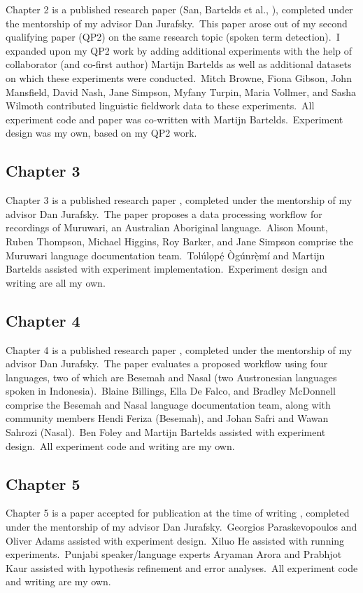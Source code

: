 \documentclass[main.tex]{subfiles}
\begin{document}
Chapter 2 is a published research paper (San, Bartelds et al., \citeyear{san2021leveraging}), completed under the mentorship of my advisor Dan Jurafsky.~This paper arose out of my second qualifying paper (QP2) on the same research topic (spoken term detection).~I expanded upon my QP2 work by adding additional experiments with the help of collaborator (and co-first author) Martijn Bartelds as well as additional datasets on which these experiments were conducted.~Mitch Browne, Fiona Gibson, John Mansfield, David Nash, Jane Simpson, Myfany Turpin, Maria Vollmer, and Sasha Wilmoth contributed linguistic fieldwork data to these experiments.~All experiment code and paper was co-written with Martijn Bartelds.~Experiment design was my own, based on my QP2 work.

\subsection{Chapter 3}

Chapter 3 is a published research paper \parencite{san-etal-2022-automated}, completed under the mentorship of my advisor Dan Jurafsky.~The paper proposes a data processing workflow for recordings of Muruwari, an Australian Aboriginal language.~Alison Mount, Ruben Thompson, Michael Higgins, Roy Barker, and Jane Simpson comprise the Muruwari language documentation team.~Tol\'{u}l\d{o}p\d{\'{e}} \`{O}g\'{u}nr\d{\`{e}}m\'{i} and Martijn Bartelds assisted with experiment implementation.~Experiment design and writing are all my own.

\subsection{Chapter 4}

Chapter 4 is a published research paper \parencite{san-etal-2023-leveraging}, completed under the mentorship of my advisor Dan Jurafsky.~The paper evaluates a proposed workflow using four languages, two of which are Besemah and Nasal (two Austronesian languages spoken in Indonesia).~Blaine Billings, Ella De Falco, and Bradley McDonnell comprise the Besemah and Nasal language documentation team, along with community members Hendi Feriza (Besemah), and Johan Safri and Wawan Sahrozi (Nasal).~Ben Foley and Martijn Bartelds assisted with experiment design.~All experiment code and writing are my own.

\subsection{Chapter 5}

Chapter 5 is a paper accepted for publication at the time of writing \parencite{san-etal-2024-predicting}, completed under the mentorship of my advisor Dan Jurafsky.~Georgios Paraskevopoulos and Oliver Adams assisted with experiment design.~Xiluo He assisted with running experiments.~Punjabi speaker/language experts Aryaman Arora and Prabhjot Kaur assisted with hypothesis refinement and error analyses.~All experiment code and writing are my own.
\end{document}
